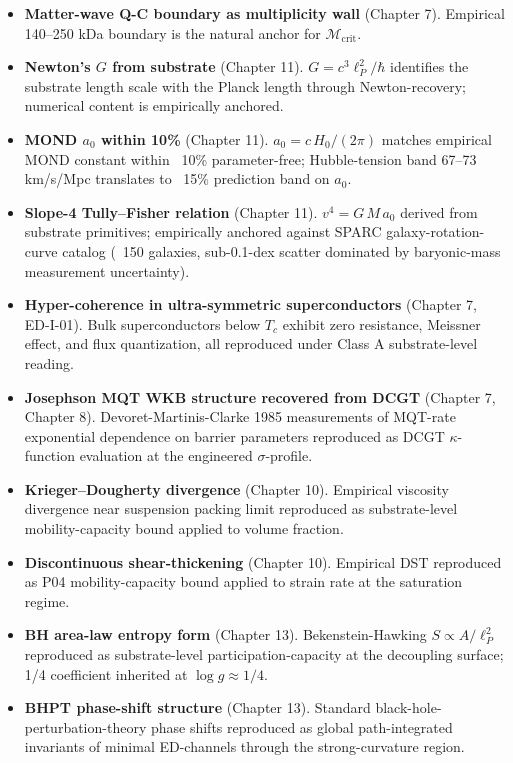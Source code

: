 \documentclass[11pt]{book}
\begin{document}
\begin{itemize}
\item \textbf{Matter-wave Q-C boundary as multiplicity wall} (Chapter 7). Empirical 140–250 kDa boundary is the natural anchor for $\mathcal{M}_\mathrm{crit}$.
\item \textbf{Newton's $G$ from substrate} (Chapter 11). $G = c^3\ell_P^2/\hbar$ identifies the substrate length scale with the Planck length through Newton-recovery; numerical content is empirically anchored.
\item \textbf{MOND $a_0$ within 10\%} (Chapter 11). $a_0 = c\,H_0/(2\pi)$ matches empirical MOND constant within ~10\% parameter-free; Hubble-tension band 67–73 km/s/Mpc translates to ~15\% prediction band on $a_0$.
\item \textbf{Slope-4 Tully–Fisher relation} (Chapter 11). $v^4 = G\,M\,a_0$ derived from substrate primitives; empirically anchored against SPARC galaxy-rotation-curve catalog (~150 galaxies, sub-0.1-dex scatter dominated by baryonic-mass measurement uncertainty).
\item \textbf{Hyper-coherence in ultra-symmetric superconductors} (Chapter 7, ED-I-01). Bulk superconductors below $T_c$ exhibit zero resistance, Meissner effect, and flux quantization, all reproduced under Class A substrate-level reading.
\item \textbf{Josephson MQT WKB structure recovered from DCGT} (Chapter 7, Chapter 8). Devoret-Martinis-Clarke 1985 measurements of MQT-rate exponential dependence on barrier parameters reproduced as DCGT $\kappa$-function evaluation at the engineered $\sigma$-profile.
\item \textbf{Krieger–Dougherty divergence} (Chapter 10). Empirical viscosity divergence near suspension packing limit reproduced as substrate-level mobility-capacity bound applied to volume fraction.
\item \textbf{Discontinuous shear-thickening} (Chapter 10). Empirical DST reproduced as P04 mobility-capacity bound applied to strain rate at the saturation regime.
\item \textbf{BH area-law entropy form} (Chapter 13). Bekenstein-Hawking $S \propto A/\ell_P^2$ reproduced as substrate-level participation-capacity at the decoupling surface; 1/4 coefficient inherited at $\log g \approx 1/4$.
\item \textbf{BHPT phase-shift structure} (Chapter 13). Standard black-hole-perturbation-theory phase shifts reproduced as global path-integrated invariants of minimal ED-channels through the strong-curvature region.

\end{itemize}
\end{document}
